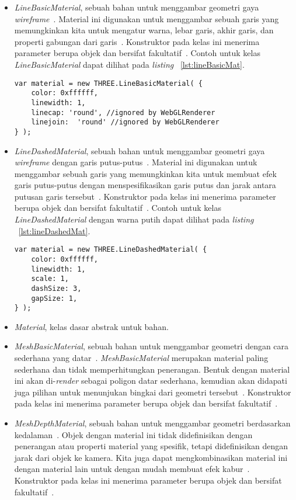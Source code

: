 \begin{itemize}
	\begin{itemize}
		\item {\it LineBasicMaterial}, sebuah bahan untuk menggambar geometri gaya {\it wireframe}~\cite{threejs}. Material ini digunakan untuk menggambar sebuah garis yang memungkinkan kita untuk mengatur warna, lebar garis, akhir garis, dan properti gabungan dari garis~\cite{learningThreejs}. Konstruktor pada kelas ini menerima parameter berupa objek dan bersifat fakultatif~\cite{threejs}. Contoh untuk kelas {\it LineBasicMaterial} dapat dilihat pada {\it listing} ~\ref{lst:lineBasicMat}.
\begin{lstlisting}[caption={Contoh penggunaan kelas {\it LineBasicMaterial}.}, label={lst:lineBasicMat},captionpos=b]
var material = new THREE.LineBasicMaterial( {
	color: 0xffffff,
	linewidth: 1,
	linecap: 'round', //ignored by WebGLRenderer
	linejoin:  'round' //ignored by WebGLRenderer
} );
\end{lstlisting}
		\item {\it LineDashedMaterial}, sebuah bahan untuk menggambar geometri gaya {\it wireframe} dengan garis putus-putus~\cite{threejs}. Material ini digunakan untuk menggambar sebuah garis yang memungkinkan kita untuk membuat efek garis putus-putus dengan menspesifikasikan garis putus dan jarak antara putusan garis tersebut~\cite{learningThreejs}. Konstruktor pada kelas ini menerima parameter berupa objek dan bersifat fakultatif~\cite{threejs}. Contoh untuk kelas {\it LineDashedMaterial} dengan warna putih dapat dilihat pada {\it listing} ~\ref{lst:lineDashedMat}.
\begin{lstlisting}[caption={Contoh penggunaan kelas {\it LineDashMaterial}.}, label={lst:lineDashedMat},captionpos=b]
var material = new THREE.LineDashedMaterial( {
	color: 0xffffff,
	linewidth: 1,
	scale: 1,
	dashSize: 3,
	gapSize: 1,
} );
\end{lstlisting}
		\item {\it Material}, kelas dasar abstrak untuk bahan.
		\item {\it MeshBasicMaterial}, sebuah bahan untuk menggambar geometri dengan cara sederhana yang datar~\cite{threejs}. {\it MeshBasicMaterial} merupakan material paling sederhana dan tidak memperhitungkan penerangan. Bentuk dengan material ini akan di-{\it render} sebagai poligon datar sederhana, kemudian akan didapati juga pilihan untuk menunjukan bingkai dari geometri tersebut~\cite{learningThreejs}. Konstruktor pada kelas ini menerima parameter berupa objek dan bersifat fakultatif~\cite{threejs}.
		\item {\it MeshDepthMaterial}, sebuah bahan untuk menggambar geometri berdasarkan kedalaman~\cite{threejs}. Objek dengan material ini tidak didefinisikan dengan penerangan atau properti material yang spesifik, tetapi didefinisikan dengan jarak dari objek ke kamera. Kita juga dapat mengkombinasikan material ini dengan material lain untuk dengan mudah membuat efek kabur~\cite{learningThreejs}. Konstruktor pada kelas ini menerima parameter berupa objek dan bersifat fakultatif~\cite{threejs}.

\end{itemize}
\end{itemize}
